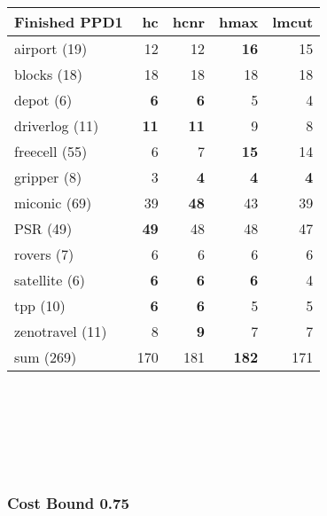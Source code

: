     \begin{center}

        \begin{tabular}{l|r|r|r|r}
            Finished PPD1 & hc & hcnr & hmax & lmcut \\\hline
            airport (19) & 12 & 12 & \textbf{16} & 15\\\hline
            blocks (18) & 18 & 18 & 18 & 18 \\\hline
            depot (6) & \textbf{6} & \textbf{6} & 5 & 4 \\\hline
            driverlog (11) & \textbf{11} & \textbf{11} & 9 & 8 \\\hline
            freecell (55) & 6 & 7 & \textbf{15} & 14 \\\hline
            gripper (8) & 3 & \textbf{4} & \textbf{4} & \textbf{4} \\\hline
            miconic (69) & 39 & \textbf{48} & 43 & 39 \\\hline
            PSR (49) & \textbf{49} & 48 & 48 & 47 \\\hline
            rovers (7) & 6 & 6 & 6 & 6 \\\hline
            satellite (6) & \textbf{6} & \textbf{6} & \textbf{6} & 4 \\\hline
            tpp (10) & \textbf{6} & \textbf{6} & 5 & 5 \\\hline
            zenotravel (11) & 8 & \textbf{9} & 7 & 7 \\\hline\hline
            sum (269) & 170 & 181 & \textbf{182} & 171 \\
        \end{tabular}

        \scriptsize
        \\
        \\
        \\
        \\
        \\
        
    \end{center}


    \subsubsection*{Cost Bound 0.75}

